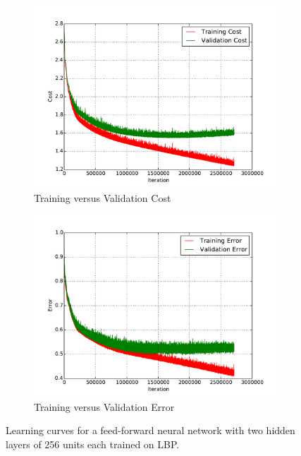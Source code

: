 \begin{figure}
	\centering
	\begin{subfigure}[b]{0.45\linewidth}
		\centering
		\includegraphics[width=\linewidth]{images/0/train_val_cost.pdf}
		\caption{Training versus Validation Cost}
	\end{subfigure}
	\hfill
	\begin{subfigure}[b]{0.45\linewidth}
		\centering
		\includegraphics[width=\linewidth]{images/0/train_val_error.pdf}
		\caption{Training versus Validation Error}
	\end{subfigure}
	\caption{Learning curves for a feed-forward neural network with two hidden layers of 256 units each trained on LBP.}
	\label{shrine0_curves}
\end{figure}

